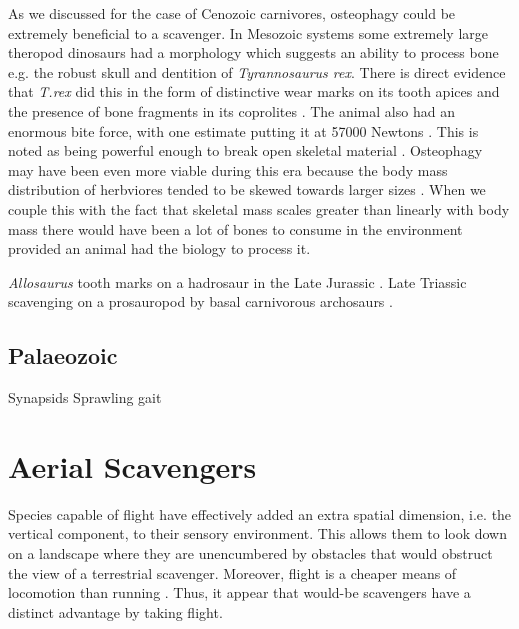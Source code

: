 \documentclass[a4paper,12pt]{article}
\begin{document}
As we discussed for the case of Cenozoic carnivores, osteophagy could be extremely beneficial to a scavenger. 
In Mesozoic systems some extremely large theropod dinosaurs had a morphology which suggests an ability to process bone e.g. the robust skull and dentition of \textit{Tyrannosaurus rex}. 
There is direct evidence that \textit{T.rex} did this in the form of distinctive wear marks on its tooth apices \citep{farlow1994wear,schubert2005wear} and the presence of bone fragments in its coprolites \citep{chin1998king}. 
The animal also had an enormous bite force, with one estimate putting it at 57000 Newtons \citep{bates2012estimating}. 
This is noted as being powerful enough to break open skeletal material \citep{rayfield2001cranial}. 
Osteophagy may have been even more viable during this era because the body mass distribution of herbviores tended to be skewed towards larger sizes \citep{10.1371/journal.pone.0051925}. 
When we couple this with the fact that skeletal mass scales greater than linearly with body mass \citep{prange1979scaling} there would have been a lot of bones to consume in the environment provided an animal had the biology to process it. 


\textit{Allosaurus} tooth marks on a hadrosaur in the Late Jurassic \citep{chure1997one}. 
Late Triassic scavenging on a prosauropod by basal carnivorous archosaurs \citep{hungerbuhler1998taphonomy}.

\subsection*{Palaeozoic}
Synapsids 
Sprawling gait



\section{Aerial Scavengers}
Species capable of flight have effectively added an extra spatial dimension, i.e. the vertical component, to their sensory environment.
This allows them to look down on a landscape where they are unencumbered by obstacles that would obstruct the view of a terrestrial scavenger.
Moreover, flight is a cheaper means of locomotion than running \citep{tucker1975energetic}. 
Thus, it appear that would-be scavengers have a distinct advantage by taking flight. 
\end{document}
